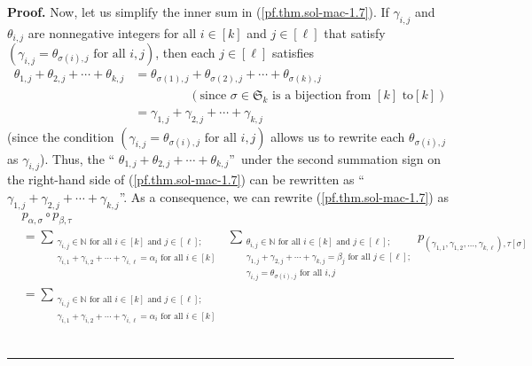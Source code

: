 \documentclass[numbers=enddot,12pt,final,onecolumn,notitlepage]{scrartcl}%
\theoremstyle{definition}
\newenvironment{proof}[1][Proof]{\noindent\textbf{#1.} }{\ \rule{0.5em}{0.5em}}
\let\sumnonlimits\sum
\renewcommand{\sum}{\sumnonlimits\limits}
\begin{document}
\begin{proof}
Now, let us simplify the inner sum in (\ref{pf.thm.sol-mac-1.7}). If
$\gamma_{i,j}$ and $\theta_{i,j}$ are nonnegative integers for all
$i\in\left[  k\right]  $ and $j\in\left[  \ell\right]  $ that satisfy $\left(
\gamma_{i,j}=\theta_{\sigma\left(  i\right)  ,j}\text{ for all }i,j\right)  $,
then each $j\in\left[  \ell\right]  $ satisfies%
\begin{align*}
\theta_{1,j}+\theta_{2,j}+\cdots+\theta_{k,j}  &  =\theta_{\sigma\left(
1\right)  ,j}+\theta_{\sigma\left(  2\right)  ,j}+\cdots+\theta_{\sigma\left(
k\right)  ,j}\\
&  \ \ \ \ \ \ \ \ \ \ \ \ \ \ \ \ \ \ \ \ \left(  \text{since }\sigma
\in\mathfrak{S}_{k}\text{ is a bijection from }\left[  k\right]  \text{ to
}\left[  k\right]  \right) \\
&  =\gamma_{1,j}+\gamma_{2,j}+\cdots+\gamma_{k,j}%
\end{align*}
(since the condition $\left(  \gamma_{i,j}=\theta_{\sigma\left(  i\right)
,j}\text{ for all }i,j\right)  $ allows us to rewrite each $\theta
_{\sigma\left(  i\right)  ,j}$ as $\gamma_{i,j}$). Thus, the \textquotedblleft%
$\theta_{1,j}+\theta_{2,j}+\cdots+\theta_{k,j}$\textquotedblright\ under the
second summation sign on the right-hand side of (\ref{pf.thm.sol-mac-1.7}) can
be rewritten as \textquotedblleft$\gamma_{1,j}+\gamma_{2,j}+\cdots
+\gamma_{k,j}$\textquotedblright. As a consequence, we can rewrite
(\ref{pf.thm.sol-mac-1.7}) as%
\begin{align*}
&  p_{\alpha,\sigma}\circ p_{\beta,\tau}\\
&  =\sum_{\substack{\gamma_{i,j}\in\mathbb{N}\text{ for all }i\in\left[
k\right]  \text{ and }j\in\left[  \ell\right]  ;\\\gamma_{i,1}+\gamma
_{i,2}+\cdots+\gamma_{i,\ell}=\alpha_{i}\text{ for all }i\in\left[  k\right]
}}\ \ \sum_{\substack{\theta_{i,j}\in\mathbb{N}\text{ for all }i\in\left[
k\right]  \text{ and }j\in\left[  \ell\right]  ;\\\gamma_{1,j}+\gamma
_{2,j}+\cdots+\gamma_{k,j}=\beta_{j}\text{ for all }j\in\left[  \ell\right]
;\\\gamma_{i,j}=\theta_{\sigma\left(  i\right)  ,j}\text{ for all }%
i,j}}p_{\left(  \gamma_{1,1},\gamma_{1,2},\ldots,\gamma_{k,\ell}\right)
,\tau\left[  \sigma\right]  }\\
&  =\sum_{\substack{\gamma_{i,j}\in\mathbb{N}\text{ for all }i\in\left[
k\right]  \text{ and }j\in\left[  \ell\right]  ;\\\gamma_{i,1}+\gamma
_{i,2}+\cdots+\gamma_{i,\ell}=\alpha_{i}\text{ for all }i\in\left[  k\right]
}}
\end{align*}
\end{proof}
\end{document}
